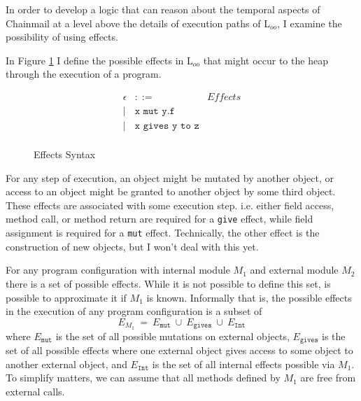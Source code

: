 \documentclass[12pt]{article}
\begin{document}
In order to develop a logic that can reason about the temporal 
aspects of Chainmail at a level above the details of execution paths 
of L$_{oo}$, I examine the possibility of using effects.

In Figure \ref{f:effects} I define the possible effects in L$_{oo}$ that might occur to the heap 
through the execution of a program.	
\begin{figure}[h]
\footnotesize
\[
\begin{array}{llr}
	\epsilon & ::= &\textit{Effects}\\ 
	| & \texttt{x mut y.f} & \\
	| & \texttt{x gives y to z} & \\
\end{array}
\]
\normalsize
\caption{Effects Syntax}
\label{f:effects}
\end{figure}
For any step of execution, an object might be mutated by another object, or access to an object might
be granted to another object by some third object. These effects are associated with some execution
step. i.e. either field access, method call, or method return are required for a \texttt{give} effect, while 
field assignment is required for a \texttt{mut} effect. Technically, the other effect  is the construction 
of new objects, but I won't deal with this yet.

For any program configuration with internal module $M_1$ and external module $M_2$ 
there is a set of possible effects. While it is not possible to define this set, is possible to 
approximate it if $M_1$ is known. Informally that is, the possible effects in the execution of any 
program configuration is a subset of 
$$E_{M_1}\ =\ E_\texttt{mut}\ \cup\ E_\texttt{gives}\ \cup\ E_{\texttt{Int}}$$
where $E_\texttt{mut}$ is the set of all possible mutations on external objects,
$E_\texttt{gives}$ is the set of all possible effects where one external object gives
 access to some object to another external object, and $E_{\texttt{Int}}$ is the set of all internal
 effects possible via $M_1$. To simplify matters, we can assume that all methods 
 defined by $M_1$ are free from external calls.
\end{document}
